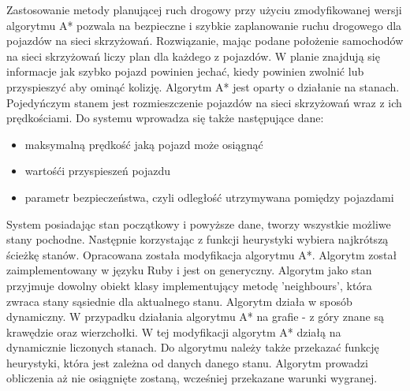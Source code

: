 Zastosowanie metody planującej ruch drogowy przy użyciu zmodyfikowanej wersji algorytmu A* pozwala na bezpieczne i szybkie zaplanowanie ruchu drogowego dla pojazdów na sieci skrzyżowań.
\newline
\newline
Rozwiązanie, mając podane położenie samochodów na sieci skrzyżowań liczy plan dla każdego z pojazdów. W planie znajdują się informacje jak szybko pojazd powinien jechać, kiedy powinien zwolnić lub przyspieszyć aby ominąć kolizję.
\newline
\newline
Algorytm A* jest oparty o działanie na stanach. Pojedyńczym stanem jest rozmieszczenie pojazdów na sieci skrzyżowań wraz z ich prędkościami.
\newline
\newline
Do systemu wprowadza się także następujące dane:
\begin{itemize}
\item maksymalną prędkość jaką pojazd może osiągnąć
\item wartośći przyspieszeń pojazdu
\item parametr bezpieczeństwa, czyli odległość utrzymywana pomiędzy pojazdami
\end{itemize}
System posiadając stan początkowy i powyższe dane, tworzy wszystkie możliwe stany pochodne. Następnie korzystając z funkcji heurystyki wybiera najkrótszą ścieżkę stanów.
\newline
\newline
Opracowana została modyfikacja algorytmu A*. Algorytm został zaimplementowany w języku Ruby i jest on generyczny. Algorytm jako stan przyjmuje dowolny obiekt klasy implementujący metodę 'neighbours', która zwraca stany sąsiednie dla aktualnego stanu.
\newline
\newline
Algorytm działa w sposób dynamiczny. W przypadku działania algorytmu A* na grafie - z góry znane są krawędzie oraz wierzchołki. W tej modyfikacji algorytm A* działą na dynamicznie liczonych stanach.
\newline
\newline
Do algorytmu należy także przekazać funkcję heurystyki, która jest zależna od danych danego stanu.
\newline
\newline
Algorytm prowadzi obliczenia aż nie osiągnięte zostaną, wcześniej przekazane warunki wygranej.
\newline
\newline
